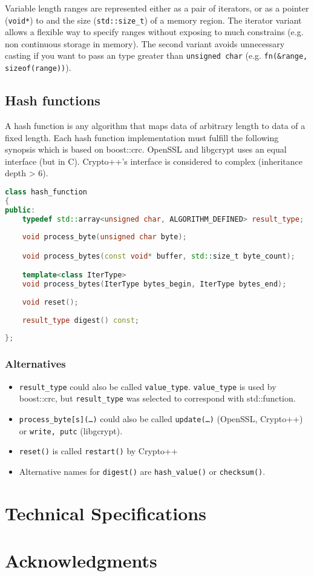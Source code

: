 \documentclass[10pt,letterpaper]{article}
\begin{document}
Variable length ranges are represented either as a pair of iterators, or as a pointer (\texttt{void*}) to and the size (\texttt{std::size\_t}) of a memory region. The iterator variant allows a flexible way to specify ranges without exposing to much constrains (e.g. non continuous storage in memory). The second variant avoids unnecessary casting if you want to pass an type greater than \texttt{unsigned char} (e.g. \texttt{fn(\&range, sizeof(range))}).

\subsection{Hash functions}
A hash function is any algorithm that maps data of arbitrary length to data of a fixed length. %
Each hash function implementation must fulfill the following synopsis which is based on boost::crc. OpenSSL and libgcrypt uses an equal interface (but in C). Crypto++'s interface is considered to complex (inheritance depth > 6).
\begin{lstlisting}[language=C++]
class hash_function
{
public:
	typedef std::array<unsigned char, ALGORITHM_DEFINED> result_type;
		
	void process_byte(unsigned char byte);

	void process_bytes(const void* buffer, std::size_t byte_count);

	template<class IterType>
	void process_bytes(IterType bytes_begin, IterType bytes_end);
	
	void reset();
	
	result_type digest() const;
	
};
\end{lstlisting}
\subsubsection*{Alternatives}
\begin{itemize}
\item \texttt{result\_type} could also be called \texttt{value\_type}. \texttt{value\_type} is used by boost::crc, but \texttt{result\_type} was selected to correspond with std::function.

\item \texttt{process\_byte[s](\dots)} could also be called \texttt{update(\dots)} (OpenSSL, Crypto++) or \texttt{write, putc} (libgcrypt).

\item \texttt{reset()} is called \texttt{restart()} by Crypto++

\item Alternative names for \texttt{digest()} are \texttt{hash\_value()} or \texttt{checksum()}.
\end{itemize}

\section{Technical Specifications}

\section{Acknowledgments}
\end{document}
